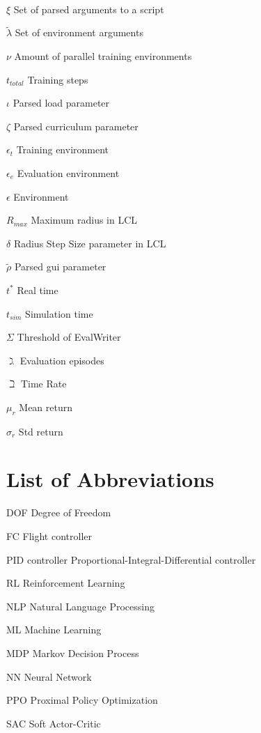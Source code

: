 \documentclass[bachelor,english]{infothesis}
\begin{document}
\begin{description}
	\\
	\item $\xi$ \dotfill Set of parsed arguments to a script
	\item $\tilde{\lambda}$ \dotfill Set of environment arguments
	\item $\nu$ \dotfill Amount of parallel training environments
	\item $t_{total}$ \dotfill Training steps
	\item $\iota$ \dotfill Parsed load parameter
	\item $\zeta$ \dotfill Parsed curriculum parameter
	\item  $\epsilon_t$ \dotfill Training environment
	\item $\epsilon_e$ \dotfill Evaluation environment
	\item $\epsilon$ \dotfill Environment
	\item $R_{max}$ \dotfill Maximum radius in LCL
	\item $\delta$ \dotfill Radius Step Size parameter in LCL
	\item $\tilde{\rho}$ \dotfill Parsed gui parameter
	\item $t^*$ \dotfill Real time
	\item  $t_{sim}$ \dotfill Simulation time
	\item $\Sigma$ \dotfill Threshold of EvalWriter
	\item $\gimel$ \dotfill Evaluation episodes
	\item $\beth$ \dotfill Time Rate
	\item $\mu_r$ \dotfill Mean return
	\item $\sigma_r$ \dotfill Std return
\end{description}

\chapter*{List of Abbreviations}

\begin{description}
	\item DOF \dotfill Degree of Freedom
	\item FC \dotfill Flight controller
	\item PID controller \dotfill Proportional-Integral-Differential controller
	\item RL \dotfill Reinforcement Learning
	\item NLP \dotfill Natural Language Processing
	\item ML \dotfill Machine Learning
	\item MDP \dotfill Markov Decision Process
	\item NN \dotfill Neural Network
	\item PPO \dotfill Proximal Policy Optimization
	\item SAC \dotfill Soft Actor-Critic
\end{description}




\end{document}
